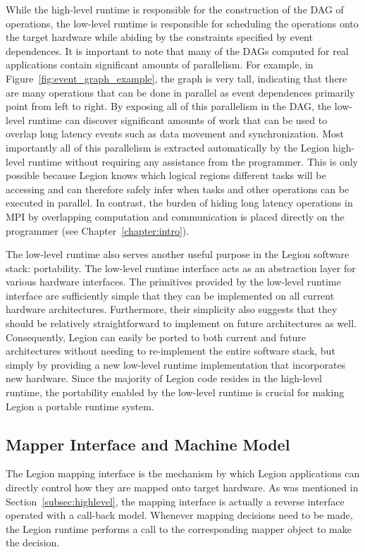 While the high-level runtime is responsible for the 
construction of the DAG of operations, the low-level
runtime is responsible for scheduling the operations
onto the target hardware while abiding by the 
constraints specified by event dependences. It is
important to note that many of the DAGs computed
for real applications contain significant amounts of
parallelism.  For example, in 
Figure~\ref{fig:event_graph_example}, the graph is
very tall, indicating that there are many operations
that can be done in parallel as event dependences
primarily point from left to right. By exposing all
of this parallelism in the DAG, the low-level runtime 
can discover significant amounts of work that can
be used to overlap long latency events such as
data movement and synchronization. Most importantly
all of this parallelism is extracted automatically
by the Legion high-level runtime without requiring
any assistance from the programmer. This is only
possible because Legion knows which logical regions
different tasks will be accessing and can therefore safely
infer when tasks and other operations can be 
executed in parallel. In contrast, the burden of 
hiding long latency operations in MPI by overlapping 
computation and communication is placed directly 
on the programmer (see Chapter~\ref{chapter:intro}).

The low-level runtime also serves another
useful purpose in the Legion software stack:
portability.  The low-level runtime interface acts
as an abstraction layer for various hardware interfaces.
The primitives provided by the low-level runtime 
interface are sufficiently simple that they can be
implemented on all current hardware architectures.
Furthermore, their simplicity also suggests that they
should be relatively straightforward to implement on future 
architectures as well.  Consequently, Legion can
easily be ported to both current and future
architectures without needing to re-implement the
entire software stack, but simply by providing
a new low-level runtime implementation that
incorporates new hardware. Since the majority of
Legion code resides in the high-level runtime,
the portability enabled by the low-level runtime
is crucial for making Legion a portable runtime
system.

\subsection{Mapper Interface and Machine Model}
\label{subsec:mapperinst}
The Legion mapping interface is the mechanism by which
Legion applications can directly control how they are 
mapped onto target hardware. As was mentioned in
Section~\ref{subsec:highlevel}, the mapping interface
is actually a reverse interface operated with a 
call-back model.  Whenever mapping decisions need to
be made, the Legion runtime performs a call to
the corresponding mapper object to make the decision.

